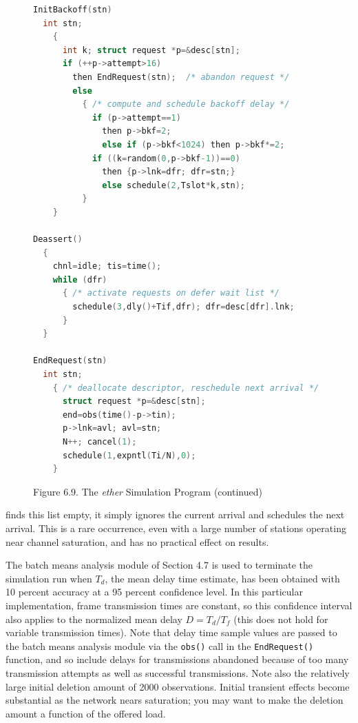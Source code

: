\begin{figure}[H]
\begin{lstlisting}[basicstyle=\ttfamily\footnotesize,language=C]
InitBackoff(stn)
  int stn;
    {
      int k; struct request *p=&desc[stn];
      if (++p->attempt>16)
        then EndRequest(stn);  /* abandon request */
        else
          { /* compute and schedule backoff delay */
            if (p->attempt==1)
              then p->bkf=2;
              else if (p->bkf<1024) then p->bkf*=2;
            if ((k=random(0,p->bkf-1))==0)
              then {p->lnk=dfr; dfr=stn;}
              else schedule(2,Tslot*k,stn);
          }
    }

Deassert()
  {
    chnl=idle; tis=time();
    while (dfr)
      { /* activate requests on defer wait list */
        schedule(3,dly()+Tif,dfr); dfr=desc[dfr].lnk;
      }
  }

EndRequest(stn)
  int stn;
    { /* deallocate descriptor, reschedule next arrival */
      struct request *p=&desc[stn];
      end=obs(time()-p->tin);
      p->lnk=avl; avl=stn;
      N++; cancel(1);
      schedule(1,expntl(Ti/N),0);
    }
\end{lstlisting}
\caption*{Figure 6.9. The \emph{ether} Simulation Program (continued)}
\end{figure}

\noindent finds this list empty, it simply ignores the current arrival and schedules the next arrival. This is a rare occurrence, even with a large number of stations operating near channel saturation, and has no practical effect on results.

The batch means analysis module of Section 4.7 is used to terminate the simulation run when $T_d$, the mean delay time estimate, has been obtained with 10 percent accuracy at a 95 percent confidence level. In this particular implementation, frame transmission times are constant, so this confidence interval also applies to the normalized mean delay $D=T_d/T_f$ (this does not hold for variable transmission times). Note that delay time sample values are passed to the batch means analysis module via the \texttt{obs()} call in the \texttt{EndRequest()} function, and so include delays for transmissions abandoned because of too many transmission attempts as well as successful transmissions. Note also the relatively large initial deletion amount of 2000 observations. Initial transient effects become substantial as the network nears saturation; you may want to make the deletion amount a function of the offered load.

